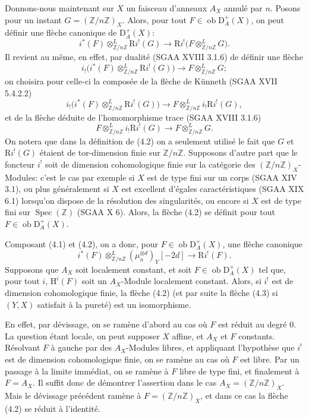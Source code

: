 \documentclass[11pt]{article}
\renewcommand{\H}{\mathrm{H}}
\DeclareMathOperator{\Spec}{Spec}
\newcommand{\R}{\mathrm{R}}
\newcommand{\D}{\mathrm{D}}
\newcommand{\Z}{\mathbb{Z}}
\newcommand{\ob}{\operatorname{ob}}
\providecommand{\ob}{\operatorname{ob}}
\providecommand{\R}{\mathrm R}
\providecommand{\Z}{\mathbb Z}
\providecommand{\Spec}{\operatorname{Spec}}
\providecommand{\Spec}{\operatorname{Spec}}
\providecommand{\Spec}{\operatorname{Spec}}
\providecommand{\Spec}{\operatorname{Spec}}
\begin{document}
Donnons-nous maintenant sur $X$ un faisceau d'anneaux $A_X$ annulé par $n$. Posons pour un instant $G=(\Z/n\Z)_X$. Alors, pour tout $F\in\ob\D_A^+(X)$, on peut définir une flèche canonique de $\D_A^+(X)$:
\begin{equation}\tag{4.2}
        i^*(F)\otimes^L_{\Z/n\Z} \R i^!(G)\longrightarrow \R i^!\bigl(F\otimes^L_{\Z/n\Z}G\bigr).
\end{equation}
Il revient au même, en effet, par dualité (SGAA XVIII 3.1.6) de définir une flèche
\[
        i_!\bigl(i^*(F)\otimes^L_{\Z/n\Z}\R i^!(G)\bigr)\longrightarrow F\otimes^L_{\Z/n\Z}G;
\]
on choisira pour celle-ci la composée de la flèche de Künneth (SGAA XVII 5.4.2.2)
\[
        i_!\bigl(i^*(F)\otimes^L_{\Z/n\Z}\R i^!(G)\bigr)\longrightarrow F\otimes^L_{\Z/n\Z}i_!\R i^!(G),
\]
et de la flèche déduite de l'homomorphisme trace (SGAA XVIII 3.1.6)
\[
        F\otimes^L_{\Z/n\Z}i_!\R i^!(G)\longrightarrow F\otimes^L_{\Z/n\Z}G.
\]
On notera que dans la définition de (4.2) on a seulement utilisé le fait que $G$ et $\R i^!(G)$ étaient de tor-dimension finie sur $\Z/n\Z$. Supposons d'autre part que le foncteur $i^!$ soit de dimension cohomologique finie sur la catégorie des $(\Z/n\Z)_X$-Modules: c'est le cas par exemple si $X$ est de type fini sur un corps (SGAA XIV 3.1), ou plus généralement si $X$ est excellent d'égales caractéristiques (SGAA XIX 6.1) lorsqu'on dispose de la résolution des singularités, ou encore si $X$ est de type fini sur $\Spec(\Z)$ (SGAA X 6). Alors, la flèche (4.2) se définit pour tout $F\in\ob\D_A^+(X)$.

Composant (4.1) et (4.2), on a donc, pour $F\in\ob\D_A^+(X)$, une flèche canonique
\begin{equation}\tag{4.3}
        i^*(F)\otimes^L_{\Z/n\Z}(\mu_n^{\otimes d})_Y[-2d]\longrightarrow \R i^!(F).
\end{equation}
Supposons que $A_X$ soit localement constant, et soit $F\in\ob\D_A^+(X)$ tel que, pour tout $i$, $\H^i(F)$ soit un $A_X$-Module localement constant. Alors, si $i^!$ est de dimension cohomologique finie, la flèche (4.2) (et par suite la flèche (4.3) si $(Y,X)$ satisfait à la pureté) est un isomorphisme.

En effet, par dévissage, on se ramène d'abord au cas où $F$ est réduit au degré $0$. La question étant locale, on peut supposer $X$ affine, et $A_X$ et $F$ constants. Résolvant $F$ à gauche par des $A_X$-Modules libres, et appliquant l'hypothèse que $i^!$ est de dimension cohomologique finie, on se ramène au cas où $F$ est libre. Par un passage à la limite immédiat, on se ramène à $F$ libre de type fini, et finalement à $F=A_X$. Il suffit donc de démontrer l'assertion dans le cas $A_X=(\Z/n\Z)_X$. Mais le dévissage précédent ramène à $F=(\Z/n\Z)_X$, et dans ce cas la flèche (4.2) se réduit à l'identité.
\end{document}
